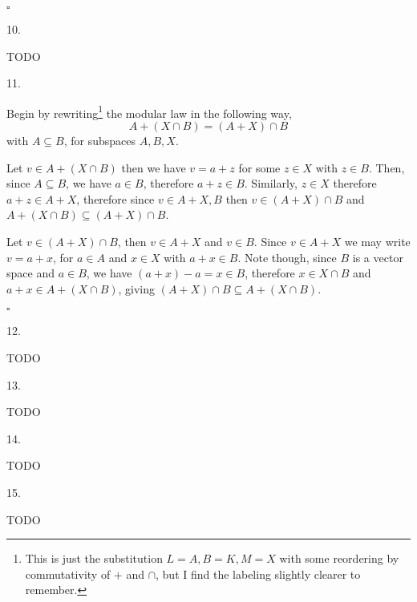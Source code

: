 \documentclass[letterpaper,11pt]{article}
\theoremstyle{definition}
\begin{document}
\begin{flushright}
	$\square$
\end{flushright}


\hrulefill

\begin{flushleft}
	10.
\end{flushleft}

TODO


\hrulefill

\begin{flushleft}
	11.
\end{flushleft}

Begin by rewriting\footnote{This is just the substitution $L = A, B = K, M = X$ with some reordering by commutativity of $+$ and $\cap$, but I find the labeling slightly clearer to remember.} the modular law in the following way, $$A + (X \cap B) = (A + X) \cap B$$ with $A \subseteq B$, for subspaces $A, B, X$. 

Let $v \in A + (X \cap B)$ then we have $v = a + z$ for some $z \in X$ with $z \in B$. Then, since $A \subseteq B$, we have $a \in B$, therefore $a + z \in B$. Similarly, $z \in X$ therefore $a + z \in A + X$, therefore since $v \in A + X, B$ then $v \in (A + X) \cap B$ and $A + (X \cap B) \subseteq (A + X) \cap B$. 

Let $v \in (A + X) \cap B$, then $v \in A + X$ and $v \in B$. Since $v \in A + X$ we may write $v = a + x$, for $a \in A$ and $x \in X$ with $a + x \in B$. Note though, since $B$ is a vector space and $a \in B$, we have $(a + x) - a = x \in B$, therefore $x \in X \cap B$ and $a + x \in A + (X \cap B)$, giving $(A + X) \cap B \subseteq A + (X \cap B)$. 

\begin{flushright}
	$\square$
\end{flushright}


\hrulefill

\begin{flushleft}
	12.
\end{flushleft}
TODO
\hrulefill

\begin{flushleft}
	13.
\end{flushleft}
TODO
\hrulefill

\begin{flushleft}
	14.
\end{flushleft}
TODO
\hrulefill

\begin{flushleft}
	15.
\end{flushleft}
TODO
\hrulefill
\end{document}
